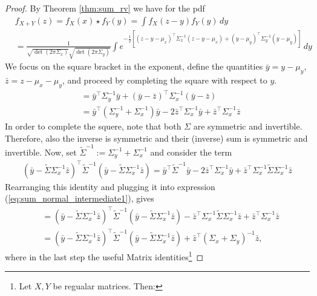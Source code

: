 \begin{proof}
By Theorem \ref{thm:sum_rv} we have for the pdf
\begin{align}
&f_{X+Y}(z) 
= f_X(x) \star f_Y(y) = \int f_X(z - y)f_Y(y)\,dy  \\
&= \frac{1}{\sqrt{\det (2\pi \Sigma_x)}\sqrt{\det (2\pi \Sigma_y)}} \int  e ^ {-\frac{1}{2}\left[(z-y-\mu_x)^\intercal \Sigma_x^{-1} (z-y-\mu_x)+ (y - \mu_y)^\intercal\Sigma_y^{-1} (y - \mu_y)\right]} \,dy
\label{eq:sum_normal_intermediate0}
\end{align}
We focus on the square bracket in the exponent, define the quantities $\bar y = y - \mu_y$, $\bar z = z - \mu_x - \mu_y$, and proceed by completing the square with respect to $y$.
\begin{align}
[\cdot] 
&= \bar y^\intercal\Sigma_y^{-1} \bar y + (\bar y - \bar z )^\intercal\Sigma_x^{-1} (\bar y - \bar z) \\
&= \bar y^\intercal(\Sigma_y ^{-1} + \Sigma_x ^{-1}) \bar y  - 2 {\bar z} ^ \intercal\Sigma_x ^{-1} \bar y + \bar z^\intercal  \Sigma_x ^{-1} \bar z  \label{eq:sum_normal_intermediate1}
\end{align}
In order to complete the squere, note that both $\Sigma$ are symmetric and invertible. Therefore, also the inverse is symmetric and their (inverse) sum is symmetric and invertible. Now, set $\tilde \Sigma ^{-1}:= \Sigma_y ^{-1} + \Sigma_x ^{-1}$ and consider the term 
\begin{align*}
(\bar y - \tilde \Sigma \Sigma_x^{-1}\bar z)^\intercal \tilde \Sigma ^{-1} (\bar y - \tilde \Sigma \Sigma_x^{-1}\bar z) 
= \bar y ^\intercal \tilde \Sigma ^{-1} \bar y 
- 2  {\bar z} ^ \intercal\Sigma_x ^{-1} \bar y
+ \bar z^\intercal \Sigma_x^{-1} \tilde \Sigma  \Sigma_x^{-1} \bar z
\end{align*}
Rearranging this identity and plugging it into expression (\ref{eq:sum_normal_intermediate1}), gives
\begin{align}
[\cdot] & = (\bar y - \tilde \Sigma \Sigma_x^{-1}\bar z)^\intercal \tilde \Sigma ^{-1} (\bar y - \tilde \Sigma \Sigma_x^{-1}\bar z) - \bar z^\intercal \Sigma_x^{-1} \tilde \Sigma  \Sigma_x^{-1} \bar z  + \bar z^\intercal  \Sigma_x ^{-1} \bar z \label{eq_matrix_normal_2}\\ 
&= (\bar y - \tilde \Sigma \Sigma_x^{-1}\bar z)^\intercal \tilde \Sigma ^{-1} (\bar y - \tilde \Sigma \Sigma_x^{-1}\bar z) + \bar z^\intercal (\Sigma_x + \Sigma_y)^{-1} \bar z,
\end{align}
where in the last step the useful Matrix identities\footnote{Let $X, Y$ be regualar matrices. Then:
}
\end{proof}
